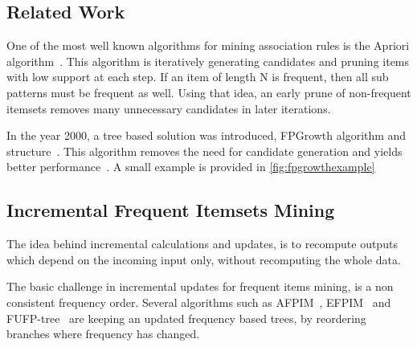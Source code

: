 \documentclass[sigconf, nonacm]{acmart}
\begin{document}
\subsection{Related Work}
  One of the most well known algorithms for mining association rules is the Apriori algorithm~\cite{agrawal1994fast}. This algorithm is iteratively generating candidates and pruning items with low support at each step. If an item of length N is frequent, then all sub patterns must be frequent as well. Using that idea, an early prune of non-frequent itemsets removes many unnecessary candidates in later iterations.

In the year 2000, a tree based solution was introduced, FPGrowth algorithm and structure~\cite{agrawal1994fast}. This algorithm removes the need for candidate generation and yields better performance~\cite{hunyadi2011performance}. A small example is provided in \autoref{fig:fpgrowthexample}


\subsection{Incremental Frequent Itemsets Mining}
The idea behind incremental calculations and updates, is to recompute outputs which depend on the incoming input only, without recomputing the whole data.

The basic challenge in incremental updates for frequent items mining, is a non consistent frequency order. Several algorithms such as AFPIM~\cite{koh2004efficient}, EFPIM~\cite{li2006fast} and FUFP-tree~\cite{hong2008incrementally} are keeping an updated frequency based trees, by reordering branches where frequency has changed.
\end{document}
